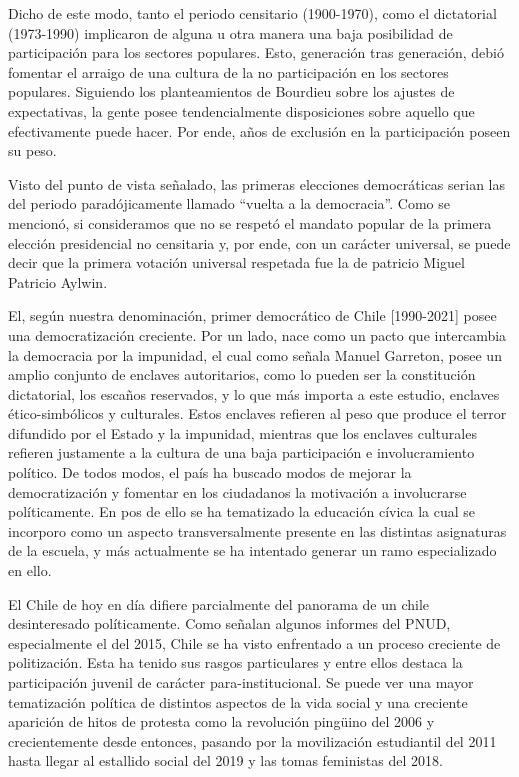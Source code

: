 \documentclass[12pt,twoside]{templates/facsothesis}
\begin{document}
Dicho de este modo, tanto el periodo censitario (1900-1970), como el dictatorial (1973-1990) implicaron de alguna u otra manera una baja posibilidad de participación para los sectores populares. Esto, generación tras generación, debió fomentar el arraigo de una cultura de la no participación en los sectores populares. Siguiendo los planteamientos de Bourdieu sobre los ajustes de expectativas, la gente posee tendencialmente disposiciones sobre aquello que efectivamente puede hacer. Por ende, años de exclusión en la participación poseen su peso.

Visto del punto de vista señalado, las primeras elecciones democráticas serian las del periodo paradójicamente llamado ``vuelta a la democracia''. Como se mencionó, si consideramos que no se respetó el mandato popular de la primera elección presidencial no censitaria y, por ende, con un carácter universal, se puede decir que la primera votación universal respetada fue la de patricio Miguel Patricio Aylwin.

El, según nuestra denominación, primer democrático de Chile {[}1990-2021{]} posee una democratización creciente. Por un lado, nace como un pacto que intercambia la democracia por la impunidad, el cual como señala Manuel Garreton, posee un amplio conjunto de enclaves autoritarios, como lo pueden ser la constitución dictatorial, los escaños reservados, y lo que más importa a este estudio, enclaves ético-simbólicos y culturales. Estos enclaves refieren al peso que produce el terror difundido por el Estado y la impunidad, mientras que los enclaves culturales refieren justamente a la cultura de una baja participación e involucramiento político. De todos modos, el país ha buscado modos de mejorar la democratización y fomentar en los ciudadanos la motivación a involucrarse políticamente. En pos de ello se ha tematizado la educación cívica la cual se incorporo como un aspecto transversalmente presente en las distintas asignaturas de la escuela, y más actualmente se ha intentado generar un ramo especializado en ello.

El Chile de hoy en día difiere parcialmente del panorama de un chile desinteresado políticamente. Como señalan algunos informes del PNUD, especialmente el del 2015, Chile se ha visto enfrentado a un proceso creciente de politización. Esta ha tenido sus rasgos particulares y entre ellos destaca la participación juvenil de carácter para-institucional. Se puede ver una mayor tematización política de distintos aspectos de la vida social y una creciente aparición de hitos de protesta como la revolución pingüino del 2006 y crecientemente desde entonces, pasando por la movilización estudiantil del 2011 hasta llegar al estallido social del 2019 y las tomas feministas del 2018.
\end{document}
